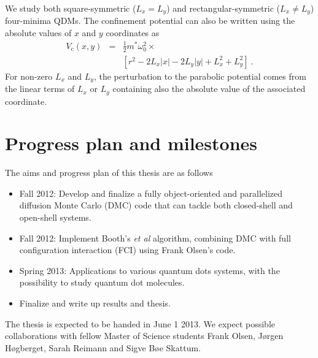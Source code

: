 \documentclass[twocolumn]{revtex4}
\begin{document}
%
 We study both square-symmetric ($L_x=L_y$) and rectangular-symmetric
($L_x \neq L_y$) four-minima QDMs. The confinement
potential can also be written using the absolute values of $x$ and $y$
coordinates as
\begin{eqnarray}
V_\mathrm{c}(x,y) &=& \frac 12 m^* \omega_0^2 \times \nonumber\\ &&
\left[ r^2 - 2 L_x |x| - 2 L_y |y| + L_x^2 + L_y^2 \right] \ .
\label{Vc_auki}
\end{eqnarray}
For non-zero $L_x$ and $L_y$, 
the perturbation to the parabolic potential comes from the linear
terms of $L_x$ or $L_y$ containing also the absolute value of the
associated coordinate.


\section*{Progress plan and milestones}
The aims and progress plan of this thesis are as follows
\begin{itemize}
\item Fall 2012:  Develop and finalize a fully object-oriented and parallelized diffusion   Monte Carlo (DMC) code
that can tackle both closed-shell and open-shell systems.
\item Fall 2012: Implement Booth's {\em et al} algorithm, combining DMC with full configuration interaction
(FCI) using Frank Olsen's code.
\item Spring 2013: Applications to various quantum dots systems, with the possibility to study quantum dot
molecules.
\item Finalize and write up results and thesis.
\end{itemize}
The thesis is expected to be handed in June 1 2013.  We expect possible collaborations with fellow Master of Science students Frank Olsen, J\o rgen H\o gberget, Sarah Reimann and Sigve B\o e Skattum.
\end{document}
